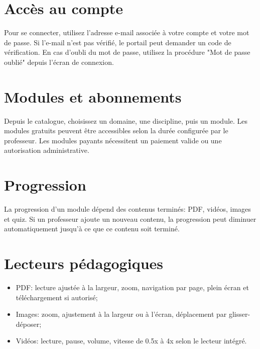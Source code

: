 \documentclass[11pt,a4paper]{article}
\begin{document}
\PAMakeCover
{}

\hfill
{}

\hfill
{}

\section{Accès au compte}
Pour se connecter, utilisez l'adresse e-mail associée à votre compte et votre mot de passe. Si l'e-mail n'est pas vérifié, le portail peut demander un code de vérification. En cas d'oubli du mot de passe, utilisez la procédure "Mot de passe oublié" depuis l'écran de connexion.

\section{Modules et abonnements}
Depuis le catalogue, choisissez un domaine, une discipline, puis un module. Les modules gratuits peuvent être accessibles selon la durée configurée par le professeur. Les modules payants nécessitent un paiement valide ou une autorisation administrative.

\section{Progression}
La progression d'un module dépend des contenus terminés: PDF, vidéos, images et quiz. Si un professeur ajoute un nouveau contenu, la progression peut diminuer automatiquement jusqu'à ce que ce contenu soit terminé.

\section{Lecteurs pédagogiques}
\begin{itemize}
  \item PDF: lecture ajustée à la largeur, zoom, navigation par page, plein écran et téléchargement si autorisé;
  \item Images: zoom, ajustement à la largeur ou à l'écran, déplacement par glisser-déposer;
  \item Vidéos: lecture, pause, volume, vitesse de 0.5x à 4x selon le lecteur intégré.
\end{itemize}
\end{document}
